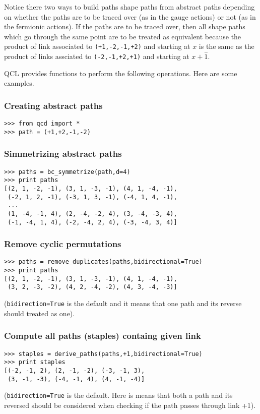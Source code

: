 \documentclass[12pt]{article}
\def\ft{\small\tt}
\begin{document}
Notice there two ways to build paths shape paths from abstract paths depending on whether the paths are to be traced over (as in the gauge actions) or not (as in the fermionic actions). If the paths are to be traced over, then all shape paths which go through the same point are to be treated as equivalent because the product of link associated to {\ft (+1,-2,-1,+2)} and starting at $x$ is the same as the product of links assciated to {\ft (-2,-1,+2,+1)} and starting at $x+\hat{1}$.

QCL provides functions to perform the following operations. Here are some examples.
\subsubsection*{Creating abstract paths}
\begin{lstlisting}
>>> from qcd import *
>>> path = (+1,+2,-1,-2)
\end{lstlisting}
\subsubsection*{Simmetrizing abstract paths}
\begin{lstlisting}
>>> paths = bc_symmetrize(path,d=4)
>>> print paths
[(2, 1, -2, -1), (3, 1, -3, -1), (4, 1, -4, -1), 
 (-2, 1, 2, -1), (-3, 1, 3, -1), (-4, 1, 4, -1),
 ...
 (1, -4, -1, 4), (2, -4, -2, 4), (3, -4, -3, 4), 
 (-1, -4, 1, 4), (-2, -4, 2, 4), (-3, -4, 3, 4)]
\end{lstlisting}
\subsubsection*{Remove cyclic permutations}
\begin{lstlisting}
>>> paths = remove_duplicates(paths,bidirectional=True)
>>> print paths
[(2, 1, -2, -1), (3, 1, -3, -1), (4, 1, -4, -1),
 (3, 2, -3, -2), (4, 2, -4, -2), (4, 3, -4, -3)]
\end{lstlisting}
({\ft bidirection=True} is the default and it means that one path and its reverse should treated as one).
\subsubsection*{Compute all paths (staples) containg given link}
\begin{lstlisting}
>>> staples = derive_paths(paths,+1,bidirectional=True)
>>> print staples
[(-2, -1, 2), (2, -1, -2), (-3, -1, 3),
 (3, -1, -3), (-4, -1, 4), (4, -1, -4)]
\end{lstlisting}
({\ft bidirection=True} is the default. Here is means that both a path and its reversed should be considered when checking if the path passes through link +1).
\end{document}
